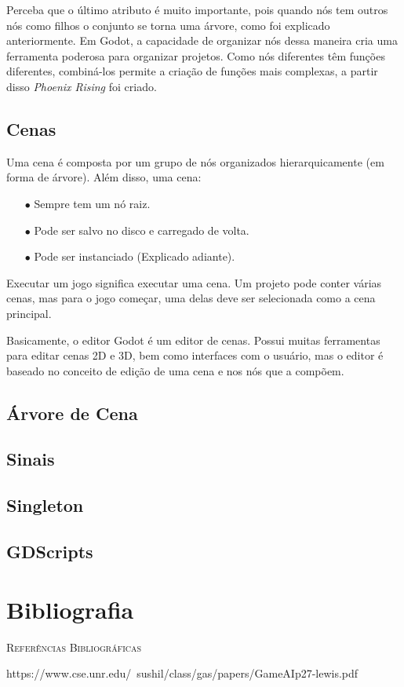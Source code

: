 Perceba que o último atributo é muito importante, pois quando nós tem outros nós
como filhos o conjunto se torna uma árvore, como foi explicado anteriormente.
Em Godot, a capacidade de organizar nós dessa maneira cria uma ferramenta 
poderosa para organizar projetos. Como nós diferentes têm funções diferentes, 
combiná-los permite a criação de funções mais complexas, a partir disso
\textit{Phoenix Rising} foi criado.

\subsection{Cenas}

Uma cena é composta por um grupo de nós organizados hierarquicamente 
(em forma de árvore). Além disso, uma cena:

\begin{itemize}
    \item[$\bullet$]
        Sempre tem um nó raiz.
    \item[$\bullet$]
        Pode ser salvo no disco e carregado de volta.
    \item[$\bullet$]
        Pode ser instanciado (Explicado adiante).
\end{itemize}

Executar um jogo significa executar uma cena. Um projeto pode conter várias 
cenas, mas para o jogo começar, uma delas deve ser selecionada como a cena 
principal.

Basicamente, o editor Godot é um editor de cenas. Possui muitas ferramentas para
editar cenas 2D e 3D, bem como interfaces com o usuário, mas o editor é baseado 
no conceito de edição de uma cena e nos nós que a compõem.

\subsection{Árvore de Cena}
\subsection{Sinais}
\subsection{Singleton}
\subsection{GDScripts}

\section{Bibliografia}

\textsc{Referências Bibliográficas} 

https://www.cse.unr.edu/~sushil/class/gas/papers/GameAIp27-lewis.pdf
